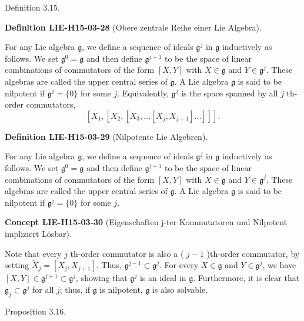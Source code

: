 \documentclass[10pt, letterpaper]{article}
\newcommand{\CustomHeading}[3]{%
  \par\medskip\noindent%
  \textbf{#1 #2} \textnormal{(#3)}.\enskip%
}
\newenvironment{DEF}[2]{\begin{unitbox}\CustomHeading{Definition}{#1}{#2}}{\end{unitbox}}
\newenvironment{CONC}[2]{\begin{unitbox}\CustomHeading{Concept}{#1}{#2}}{\end{unitbox}}
\begin{document}
Definition 3.15. 



\begin{DEF}{LIE-H15-03-28}{Obere zentrale Reihe einer Lie Algebra}
For any Lie algebra $\mathfrak{g}$, we define a sequence of ideals $\mathfrak{g}^{j}$ in $\mathfrak{g}$ inductively as follows. We set $\mathfrak{g}^{0}=\mathfrak{g}$ and then define $\mathfrak{g}^{j+1}$ to be the space of linear combinations of commutators of the form $[X, Y]$ with $X \in \mathfrak{g}$ and $Y \in \mathfrak{g}^{j}$. These algebras are called the upper central series of $\mathfrak{g}$. A Lie algebra $\mathfrak{g}$ is said to be nilpotent if $\mathfrak{g}^{j}=\{0\}$ for some $j$.
Equivalently, $\mathfrak{g}^{j}$ is the space spanned by all $j$ th-order commutators,
$$
\left[X_{1},\left[X_{2},\left[X_{3}, \ldots\left[X_{j}, X_{j+1}\right] \ldots\right]\right]\right] .
$$
\end{DEF}


\begin{DEF}{LIE-H15-03-29}{Nilpotente Lie Algebren}
For any Lie algebra $\mathfrak{g}$, we define a sequence of ideals $\mathfrak{g}^{j}$ in $\mathfrak{g}$ inductively as follows. We set $\mathfrak{g}^{0}=\mathfrak{g}$ and then define $\mathfrak{g}^{j+1}$ to be the space of linear combinations of commutators of the form $[X, Y]$ with $X \in \mathfrak{g}$ and $Y \in \mathfrak{g}^{j}$. These algebras are called the upper central series of $\mathfrak{g}$. A Lie algebra $\mathfrak{g}$ is said to be nilpotent if $\mathfrak{g}^{j}=\{0\}$ for some $j$.
\end{DEF}


\begin{CONC}{LIE-H15-03-30}{Eigenschaften j-ter Kommutatoren und Nilpotent impliziert Lösbar}
Note that every $j$ th-order commutator is also a ( $j-1$ )th-order commutator, by setting $\tilde{X}_{j}=\left[X_{j}, X_{j+1}\right]$. Thus, $\mathfrak{g}^{j-1} \subset \mathfrak{g}^{j}$. For every $X \in \mathfrak{g}$ and $Y \in \mathfrak{g}^{j}$, we have $[X, Y] \in \mathfrak{g}^{j+1} \subset \mathfrak{g}^{j}$, showing that $\mathfrak{g}^{j}$ is an ideal in $\mathfrak{g}$. Furthermore, it is clear that $\mathfrak{g}_{j} \subset \mathfrak{g}^{j}$ for all $j$; thus, if $\mathfrak{g}$ is nilpotent, $\mathfrak{g}$ is also solvable.
\end{CONC}

Proposition 3.16. 
\end{document}
